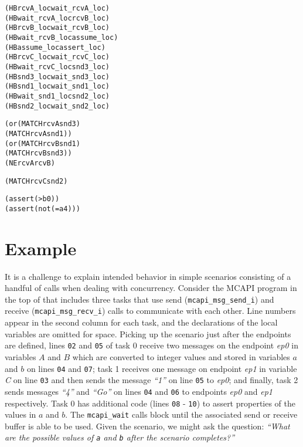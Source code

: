 \newsavebox{\boxSMT}
\begin{lrbox}{\boxSMT}
\begin{minipage}[c]{0.4\linewidth}
\begin{alltt}
(HB rcvA_loc wait_rcvA_loc)
(HB wait_rcvA_loc rcvB_loc)
(HB rcvB_loc wait_rcvB_loc)
(HB wait_rcvB_loc assume_loc)
(HB assume_loc assert_loc)
(HB rcvC_loc wait_rcvC_loc)
(HB wait_rcvC_loc snd3_loc)
(HB snd3_loc wait_snd3_loc)
(HB snd1_loc wait_snd1_loc)
(HB wait_snd1_loc snd2_loc)
(HB snd2_loc wait_snd2_loc)

(or (MATCH rcvA snd3)
    (MATCH rcvA snd1))
(or (MATCH rcvB  snd1)
    (MATCH rcvB snd3))
(NE rcvA rcvB)

(MATCH rcvC snd2)

(assert (> b 0))
(assert (not (= a 4)))
\end{alltt}
\end{minipage}
\end{lrbox}

\section{Example}

It is a challenge to explain intended behavior in simple scenarios
consisting of a handful of calls when dealing with concurrency. Consider
the MCAPI program in the top of  that includes three
tasks that use send (\texttt{mcapi\_msg\_send\_i}) and receive
(\texttt{mcapi\_msg\_recv\_i}) calls to communicate with each other.
Line numbers appear in the second column for each task, and the
declarations of the local variables are omitted for space. Picking up
the scenario just after the endpoints are defined, lines \texttt{02}
and \texttt{05} of task 0 receive two messages on the endpoint
\textit{ep0} in variables $A$ and $B$ which are
converted to integer values and stored in variables $a$ and
$b$ on lines \texttt{04} and \texttt{07}; task 1 receives one
message on endpoint \textit{ep1} in variable \textit{C} on line
\texttt{03} and then sends the message \textit{``1''} on line \texttt{05} to
\textit{ep0}; and finally, task 2 sends messages \textit{``4''} and \textit{``Go''} on
lines \texttt{04} and \texttt{06} to endpoints \textit{ep0} and
\textit{ep1} respectively. Task 0 has additional code (lines \texttt{08} -
\texttt{10}) to assert properties of the values in $a$ and
$b$. The \texttt{mcapi\_wait} calls block until the associated
send or receive buffer is able to be used. Given the scenario, we
might ask the question: \emph{``What are the possible values of
\texttt{a} and \texttt{b} after the scenario completes?''}

